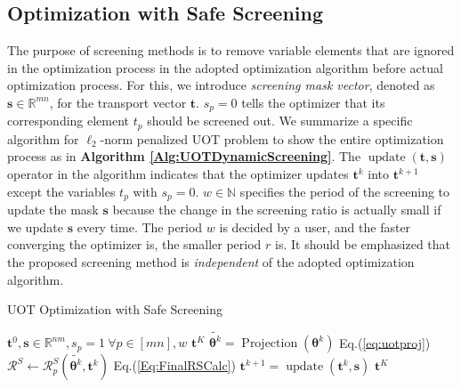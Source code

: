 \documentclass[twoside]{article}
\theoremstyle{plain}
\renewcommand{\vec}[1]{\bm{#1}}
\begin{document}
\subsection{Optimization with Safe Screening}
The purpose of screening methods is to remove variable elements that are ignored in the optimization process in the adopted optimization algorithm before actual optimization process. For this, we introduce {\it screening mask vector}, denoted as $\vec{s} \in \mathbb{R}^{mn}$, for the transport vector $\vec{t}$. $s_p = 0$ tells the optimizer that its corresponding element $t_p$ should be screened out. We summarize a specific algorithm for $\ell_2$-norm penalized UOT problem to show the entire optimization process as in {\bf Algorithm \ref{Alg:UOTDynamicScreening}}. The $\operatorname{update}(\vec{t},\vec s)$ operator in the algorithm indicates that the optimizer updates $\vec{t}^k$ into $\vec{t}^{k+1}$ except the variables $t_p$ with $s_p =0$. $w \in \mathbb{N}$ specifies the period of the screening to update the mask $\vec s$ because the change in the screening ratio is actually small if we update $\vec s$ every time. The period $w$ is decided by a user, and the faster converging the optimizer is, the smaller period $r$ is. It should be emphasized that the proposed screening method is {\it independent} of the adopted optimization algorithm. 

 \begin{algorithm}
 \caption{UOT Optimization with Safe Screening}
 \begin{algorithmic}[h]
 \label{Alg:UOTDynamicScreening}
 \renewcommand{\algorithmicrequire}{\textbf{Input:}}
 \renewcommand{\algorithmicensure}{\textbf{Output:}}
 \REQUIRE $\vec{t}^0,  \vec s \in \mathbb{R}^{nm}, s_{p}=1\ \forall p \in [mn], w$
 \ENSURE $\vec t^{K}$
 \STATE $\tilde{\vec{\theta}^{k}} = \operatorname{Projection}(\vec{\theta}^k)$ \hfill Eq.(\ref{eq:uotproj})
 \STATE $\mathcal{R}^{S} \leftarrow \mathcal{R}_{p}^S{(\tilde{\vec{\theta}^{k}},\vec{t}^k)}$ \hfill Eq.(\ref{Eq:FinalRSCalc})
   \STATE{$\vec s \leftarrow {s_{p} = 0 \text{ if} {\displaystyle \max_{\vec{\theta} \in \mathcal{R}^S} {\vec x_{p}}^T\vec{\theta}^{k} <\lambda c_{p} }}$ \hfill Eq.(\ref{eq:kktineq})}
 \ENDFOR
  \ENDIF
  \STATE $\vec{t}^{k+1} = \operatorname{update}(\vec{t}^k,\vec s)$ \hfill {}
 \ENDFOR
  \RETURN $\vec{t}^{K} $
 \end{algorithmic}
 \end{algorithm}
\end{document}
